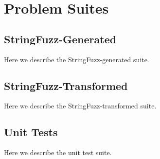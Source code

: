 \section{Problem Suites}

    \subsection{StringFuzz-Generated}

        Here we describe the StringFuzz-generated suite.

    \subsection{StringFuzz-Transformed}

        Here we describe the StringFuzz-transformed suite.

    \subsection{Unit Tests}

        Here we describe the unit test suite.
